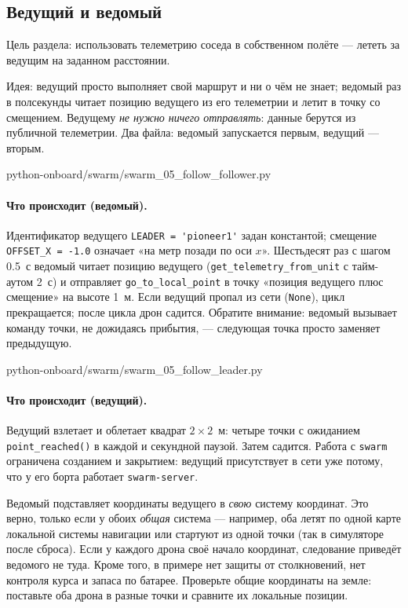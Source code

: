 \subsection{Ведущий и ведомый}
\label{sec:swarm-follow}

Цель раздела: использовать телеметрию соседа в собственном полёте --- лететь за ведущим на заданном расстоянии.

Идея: ведущий просто выполняет свой маршрут и ни о чём не знает; ведомый раз в полсекунды читает позицию ведущего из его телеметрии и летит в точку со смещением. Ведущему \emph{не нужно ничего отправлять}: данные берутся из публичной телеметрии. Два файла: ведомый запускается первым, ведущий --- вторым.

\begin{codefile}[python]{python-onboard/swarm/swarm_05_follow_follower.py}
\end{codefile}

\paragraph{Что происходит (ведомый).} Идентификатор ведущего \verb|LEADER = 'pioneer1'| задан константой; смещение \verb|OFFSET_X = -1.0| означает «на метр позади по оси $x$». Шестьдесят раз с шагом 0.5~с ведомый читает позицию ведущего (\verb|get_telemetry_from_unit| с тайм-аутом 2~с) и отправляет \verb|go_to_local_point| в точку «позиция ведущего плюс смещение» на высоте 1~м. Если ведущий пропал из сети (\verb|None|), цикл прекращается; после цикла дрон садится. Обратите внимание: ведомый вызывает команду точки, не дожидаясь прибытия, --- следующая точка просто заменяет предыдущую.

\begin{codefile}[python]{python-onboard/swarm/swarm_05_follow_leader.py}
\end{codefile}

\paragraph{Что происходит (ведущий).} Ведущий взлетает и облетает квадрат $2\times 2$~м: четыре точки с ожиданием \verb|point_reached()| в каждой и секундной паузой. Затем садится. Работа с \verb|swarm| ограничена созданием и закрытием: ведущий присутствует в сети уже потому, что у его борта работает \texttt{swarm-server}.

\begin{warnbox}
Ведомый подставляет координаты ведущего в \emph{свою} систему координат. Это верно, только если у обоих \emph{общая} система --- например, оба летят по одной карте локальной системы навигации или стартуют из одной точки (так в симуляторе после сброса). Если у каждого дрона своё начало координат, следование приведёт ведомого не туда. Кроме того, в примере нет защиты от столкновений, нет контроля курса и запаса по батарее. Проверьте общие координаты на земле: поставьте оба дрона в разные точки и сравните их локальные позиции.
\end{warnbox}


